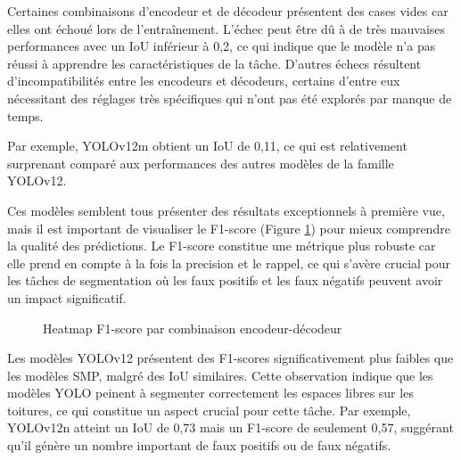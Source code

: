 Certaines combinaisons d'encodeur et de décodeur présentent des cases vides car elles ont échoué lors de l'entraînement. L'échec peut être dû à de très mauvaises performances avec un IoU inférieur à 0,2, ce qui indique que le modèle n'a pas réussi à apprendre les caractéristiques de la tâche. D'autres échecs résultent d'incompatibilités entre les encodeurs et décodeurs, certains d'entre eux nécessitant des réglages très spécifiques qui n'ont pas été explorés par manque de temps.

Par exemple, YOLOv12m obtient un IoU de 0,11, ce qui est relativement surprenant comparé aux performances des autres modèles de la famille YOLOv12.

Ces modèles semblent tous présenter des résultats exceptionnels à première vue, mais il est important de visualiser le F1-score (Figure \ref{fig:ch4_01_architecture_backbone_heatmap_08_eval_test_f1_score_mean}) pour mieux comprendre la qualité des prédictions. Le F1-score constitue une métrique plus robuste car elle prend en compte à la fois la precision et le rappel, ce qui s'avère crucial pour les tâches de segmentation où les faux positifs et les faux négatifs peuvent avoir un impact significatif.

\begin{figure}[H]
    \centering
    \caption{Heatmap F1-score par combinaison encodeur-décodeur}
    \label{fig:ch4_01_architecture_backbone_heatmap_08_eval_test_f1_score_mean}
\end{figure}

Les modèles YOLOv12 présentent des F1-scores significativement plus faibles que les modèles SMP, malgré des IoU similaires. Cette observation indique que les modèles YOLO peinent à segmenter correctement les espaces libres sur les toitures, ce qui constitue un aspect crucial pour cette tâche. Par exemple, YOLOv12n atteint un IoU de 0,73 mais un F1-score de seulement 0,57, suggérant qu'il génère un nombre important de faux positifs ou de faux négatifs.

